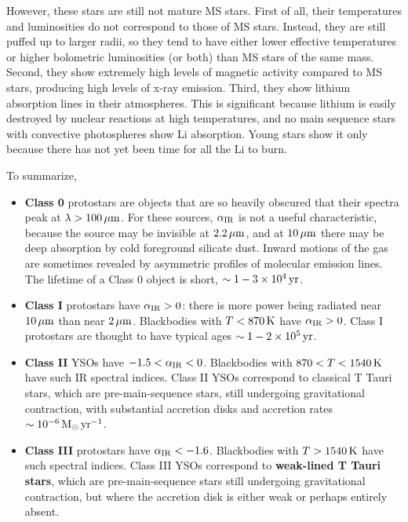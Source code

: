 \documentclass[a4paper,10pt]{article}
\begin{document}
{\noindent}However, these stars are still not mature MS stars. First of all, their temperatures and luminosities do not correspond to those of MS stars. Instead, they are still puffed up to larger radii, so they tend to have either lower effective temperatures or higher bolometric luminosities (or both) than MS stars of the same mass. Second, they show extremely high levels of magnetic activity compared to MS stars, producing high levels of x-ray emission. Third, they show lithium absorption lines in their atmospheres. This is significant because lithium is easily destroyed by nuclear reactions at high temperatures, and no main sequence stars with convective photospheres show Li absorption. Young stars show it only because there has not yet been time for all the Li to burn.

To summarize,

\begin{itemize}
    \item \textbf{Class 0} protostars are objects that are so heavily obscured that their spectra peak at $\lambda>100\,\mu{\rm m}$. For these sources, $\alpha_{\rm IR}$ is not a useful characteristic, because the source may be invisible at $2.2\,\mu{\rm m}$, and at $10\,\mu{\rm m}$ there may be deep absorption by cold foreground silicate dust. Inward motions of the gas are sometimes revealed by asymmetric profiles of molecular emission lines. The lifetime of a Class 0 object is short, $\sim1-3\times10^4\,{\rm yr}$.
    \item \textbf{Class I} protostars have $\alpha_{\rm IR}>0$: there is more power being radiated near $10\,\mu{\rm m}$ than near $2\,\mu{\rm m}$. Blackbodies with $T<870\,{\rm K}$ have $\alpha_{\rm IR}>0$. Class I protostars are thought to have typical ages $\sim1-2\times10^5\,{\rm yr}$.
    \item \textbf{Class II} YSOs have $-1.5<\alpha_{\rm IR}<0$. Blackbodies with $870<T<1540\,{\rm K}$ have such IR spectral indices. Class II YSOs correspond to classical T Tauri stars, which are pre-main-sequence stars, still undergoing gravitational contraction, with substantial accretion disks and accretion rates $\sim10^{-6}\,{\rm M_\odot\,yr^{-1}}$.
    \item \textbf{Class III} protostars have $\alpha_{\rm IR}<-1.6$. Blackbodies with $T>1540\,{\rm K}$ have such spectral indices. Class III YSOs correspond to \textbf{weak-lined T Tauri stars}, which are pre-main-sequence stars still undergoing gravitational contraction, but where the accretion disk is either weak or perhaps entirely absent.
\end{itemize}
\end{document}
